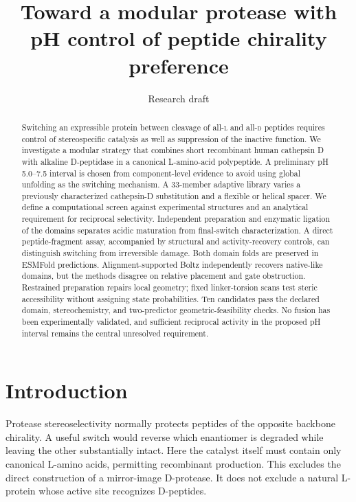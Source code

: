 \documentclass{article}
\title{Toward a modular protease with pH control of peptide chirality preference}
\author{Research draft}
\newcommand{\Dpep}{\textsc{d}}
\newcommand{\Lpep}{\textsc{l}}
\begin{document}
\maketitle
{}

\begin{abstract}
Switching an expressible protein between cleavage of all-\Lpep{} and all-\Dpep{}
peptides requires control of stereospecific catalysis as well as suppression of
the inactive function. We investigate a modular strategy that combines short
recombinant human cathepsin D with alkaline D-peptidase in a canonical
L-amino-acid polypeptide. A preliminary pH 5.0--7.5 interval is chosen from
component-level evidence to avoid using global unfolding as the switching
mechanism. A 33-member adaptive library varies a previously characterized cathepsin-D
substitution and a flexible or helical spacer. We define a computational
screen against experimental structures and an analytical requirement for
reciprocal selectivity. Independent preparation and enzymatic ligation of the
domains separates acidic maturation from final-switch characterization. A
direct peptide-fragment assay, accompanied by structural and activity-recovery
controls, can distinguish switching from irreversible damage. Both domain folds are preserved in ESMFold predictions. Alignment-supported
Boltz independently recovers native-like domains, but the methods disagree on
relative placement and gate obstruction. Restrained preparation repairs local
geometry; fixed linker-torsion scans test steric accessibility without assigning
state probabilities. Ten candidates pass the declared domain, stereochemistry,
and two-predictor geometric-feasibility checks. No fusion has been experimentally validated, and sufficient
reciprocal activity in the proposed pH interval remains the central unresolved
requirement.
\end{abstract}

\section{Introduction}
Protease stereoselectivity normally protects peptides of the opposite backbone
chirality. A useful switch would reverse which enantiomer is degraded while
leaving the other substantially intact. Here the catalyst itself must contain
only canonical L-amino acids, permitting recombinant production. This excludes
the direct construction of a mirror-image D-protease. It does not exclude a
natural L-protein whose active site recognizes D-peptides.
\end{document}
